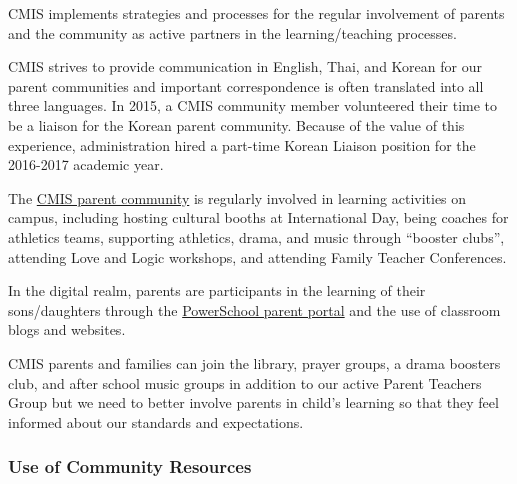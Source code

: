 

\begin{findings}
CMIS implements strategies and processes for the regular involvement of parents and the community as active partners in the learning/teaching processes.

CMIS strives to provide communication in English, Thai, and Korean for our parent communities and important correspondence is often translated into all three languages.  In 2015, a CMIS community member volunteered their time to be a liaison for the Korean parent community.  Because of the value of this experience, administration hired a part-time Korean Liaison position for the 2016-2017 academic year.

The \href{http://blogs.cmis.ac.th/ptg/}{CMIS parent community} is regularly involved in learning activities on campus, including hosting cultural booths at International Day, being coaches for athletics teams, supporting athletics, drama, and music through “booster clubs”, attending Love and Logic workshops, and attending Family Teacher Conferences.

In the digital realm, parents are participants in the learning of their sons/daughters through the \href{https://cmis.powerschool.com/public/}{PowerSchool parent portal} and the use of classroom blogs and websites.


CMIS parents and families can join the library, prayer groups, a drama boosters club, and after school music groups in addition to our active Parent Teachers Group but we need to better involve parents in child’s learning so that they feel informed about our standards and expectations.
\end{findings}

\subsubsection{Use of Community Resources}

